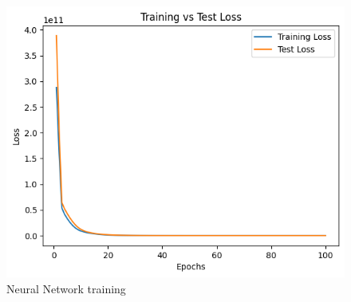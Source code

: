 \documentclass[a4paper, 11pt]{article}
\begin{document}
\begin{figure}[H]
\includegraphics[scale=0.75]{traintestloss}
\centering
\caption{Neural Network training}
\label{fig:traintestloss}
\end{figure}
\end{document}

